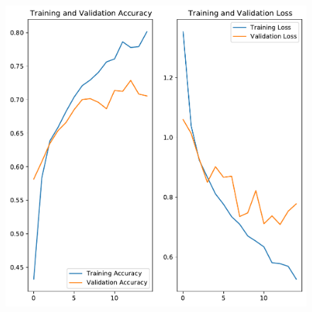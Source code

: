 \documentclass[t]{beamer}
\begin{document}
\begin{frame}
\begin{figure}
\begin{minipage}{0.5\textwidth}
            \includegraphics[width=\textwidth]{./teach-plots/post_augmentation.pdf}
        \end{minipage}
    \end{figure}
\end{frame}
\end{document}
